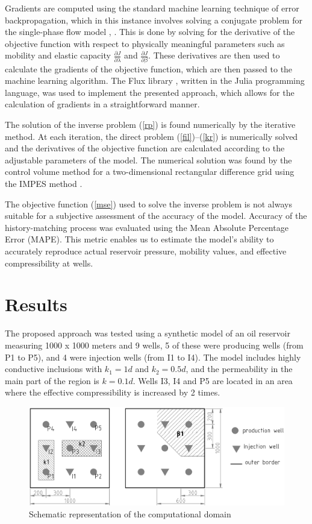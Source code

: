 \documentclass[
11pt,%
tightenlines,%
twoside,%
onecolumn,%
nofloats,%
nobibnotes,%
nofootinbib,%
superscriptaddress,%
noshowpacs,%
centertags]%
{revtex4}
\begin{document}
Gradients are computed using the standard machine learning technique of error backpropagation, which in this instance involves solving a conjugate problem for the single-phase flow model  \cite{kos3}, \cite{far}. This is done by solving for the derivative of the objective function with respect to physically meaningful parameters such as mobility and elastic capacity $\frac{\partial J}{\partial \lambda}$ and $\frac{\partial J}{\partial \beta}$. These derivatives are then used to calculate the gradients of the objective function, which are then passed to the machine learning algorithm. The Flux library \cite{inn}, written in the Julia programming language, was used to implement the presented approach, which allows for the calculation of gradients in a straightforward manner.


The solution of the inverse problem (\ref{rp}) is found  numerically
by the iterative method. At each iteration, the direct problem
(\ref{fil})--(\ref{kr}) is numerically solved and the derivatives of
the objective function are calculated according to the adjustable
parameters of the model. The numerical solution was found
by the control volume method for a two-dimensional rectangular
difference grid using the IMPES method \cite{azi}.

The objective function ({\ref{mse}}) used to solve the inverse problem is not always suitable for a subjective assessment of the accuracy of the model. Accuracy of the history-matching process was evaluated using the Mean Absolute Percentage Error (MAPE). This metric enables us to estimate the model's ability to accurately reproduce actual reservoir pressure, mobility values, and effective compressibility at wells.


\section{Results}

The proposed approach was tested using a synthetic model of an oil reservoir measuring 1000 x 1000 meters and 9 wells, 5 of these were producing wells (from P1 to P5), and 4 were injection wells (from I1 to I4). The model includes highly conductive inclusions with $k_1 = 1d$ and $k_2 = 0.5 d$, and the permeability in the main part of the region is $k = 0.1d$. Wells I3, I4 and P5 are located in an area where the effective compressibility is increased by 2 times.

\begin{figure}
	\centering
	\includegraphics[width=0.7\linewidth]{fig1}
	\caption{Schematic representation of the computational domain}
	\label{fig:schime}
\end{figure}
\end{document}
